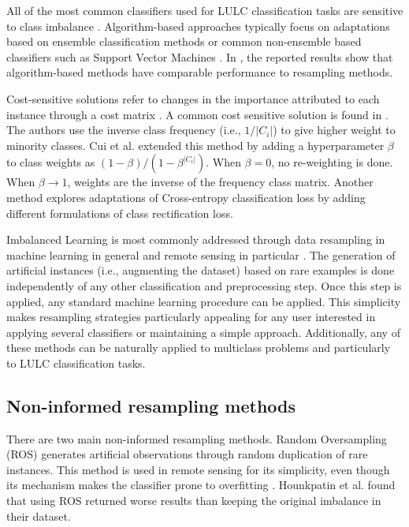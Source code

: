 \documentclass[parskip=full]{scrartcl}
\begin{document}
All of the most common classifiers used for LULC classification tasks
\cite{Khatami2016, Gavade2019} are sensitive to class imbalance
\cite{Blagus2010}. Algorithm-based approaches typically focus on adaptations
based on ensemble classification methods \cite{Mellor2015} or common
non-ensemble based classifiers such as Support Vector Machines \cite{Shao2014}.
In \cite{Lee2016}, the reported results show that algorithm-based methods have
comparable performance to resampling methods.

Cost-sensitive solutions refer to changes in the importance attributed to each
instance through a cost matrix \cite{Huang2016,Cui2019,Dong2017}. A common cost
sensitive solution is found in \cite{Huang2016}. The authors use the inverse
class frequency (i.e., $1/|C_i|$) to give higher weight to minority classes. Cui
et al. \cite{Cui2019} extended this method by adding a hyperparameter $\beta$ to
class weights as $(1-\beta)/(1-\beta^{|C_i|})$. When $\beta=0$, no re-weighting
is done. When $\beta\rightarrow 1$, weights are the inverse of the frequency
class matrix. Another method \cite{Dong2017} explores adaptations of
Cross-entropy classification loss by adding different formulations of class
rectification loss.

Imbalanced Learning is most commonly addressed through data resampling in
machine learning in general and remote sensing in particular \cite{Feng2019}.
The generation of artificial instances (i.e., augmenting the dataset) based on
rare examples is done independently of any other classification and
preprocessing step. Once this step is applied, any standard machine learning
procedure can be applied. This simplicity makes resampling strategies
particularly appealing for any user interested in applying several classifiers
or maintaining a simple approach. Additionally, any of these methods can be
naturally applied to multiclass problems and particularly to LULC classification
tasks.

\subsection{Non-informed resampling methods}

There are two main non-informed resampling methods. Random Oversampling (ROS)
generates artificial observations through random duplication of rare instances.
This method is used in remote sensing \cite{Sharififar2019, Hounkpatin2018} for
its simplicity, even though its mechanism makes the classifier prone to
overfitting \cite{Krawczyk2016}. Hounkpatin et al. \cite{Hounkpatin2018} found
that using ROS returned worse results than keeping the original imbalance in
their dataset.
\end{document}
